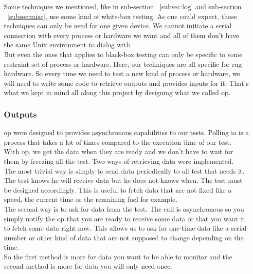 \documentclass[12pt]{article}
\theoremstyle{definition}
\theoremstyle{definition}
\begin{document}
Some techniques we mentioned, like in sub-section ~\ref{subsec:log} and sub-section ~\ref{subsec:misc}, use some kind of white-box testing. As one could expect, those techniques can only be used for one given device. We cannot initiate a serial connection with every process or hardware we want and all of them don't have the same Unix environment to dialog with.\\

But even the ones that applies to black-box testing can only be specific to some restraint set of process or hardware. Here, our techniques are all specific for \gls{rug} hardware. So every time we need to test a new kind of process or hardware, we will need to write some code to retrieve outputs and provides inputs for it. That's what we kept in mind all along this project by designing what we called \gls{op}.\\

\subsubsection{Outputs}

\gls{op} were designed to provides asynchronous capabilities to our tests. Polling \gls{io} is a process that takes a lot of times compared to the execution time of our test. With \gls{op}, we get the data when they are ready and we don't have to wait for them by freezing all the test. Two ways of retrieving data were implemented.\\

The most trivial way is simply to send data periodically to all test that needs it. The test knows he will receive data but he does not knows when. The test must be designed accordingly. This is useful to fetch data that are not fixed like a speed, the current time or the remaining fuel for example.\\

The second way is to ask for data from the test. The call is asynchronous so you simply notify the \gls{op} that you are ready to receive some data or that you want it to fetch some data right now. This allows us to ask for one-time data like a serial number or other kind of data that are not supposed to change depending on the time.\\

So the first method is more for data you want to be able to monitor and the second method is more for data you will only need once.\\
\end{document}
